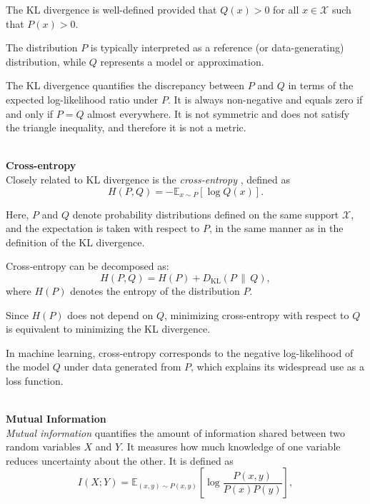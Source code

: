 The KL divergence is well-defined provided that $Q(x) > 0$ for all $x \in \mathcal{X}$ such that $P(x) > 0$.

The distribution $P$ is typically interpreted as a reference (or data-generating) distribution, while $Q$ represents a model or approximation.

The KL divergence quantifies the discrepancy between $P$ and $Q$ in terms of the expected log-likelihood ratio under $P$. It is always non-negative and equals zero if and only if $P = Q$ almost everywhere. It is not symmetric and does not satisfy the triangle inequality, and therefore it is not a metric.

\textbf{\\Cross-entropy\\}
Closely related to KL divergence is the \emph{cross-entropy} \cite{cover2006}, defined as
\begin{equation*}
H(P, Q) = - \mathbb{E}_{x \sim P} [\log Q(x)].
\end{equation*}

Here, $P$ and $Q$ denote probability distributions defined on the same \break support  $\mathcal{X}$, and the expectation is taken with respect to $P$, in the same manner as in the definition of the KL divergence.

Cross-entropy can be decomposed as:
\begin{equation}
H(P, Q) = H(P) + D_{\mathrm{KL}}(P \,\|\, Q),
\end{equation}
where $H(P)$ denotes the entropy of the distribution $P$.

Since $H(P)$ does not depend on $Q$, minimizing cross-entropy with respect to $Q$ is equivalent to minimizing the KL divergence.

In machine learning, cross-entropy corresponds to the negative log-likelihood of the model $Q$ under data generated from $P$, which explains its widespread use \break as a loss function.

\textbf{\\Mutual Information\\}
\emph{Mutual information}\cite{shannon1948,cover2006} quantifies the amount of information shared between two random variables $X$ and $Y$. It measures how much knowledge of one variable reduces uncertainty about the other. It is defined as
\begin{equation}
I(X; Y) = \mathbb{E}_{(x,y) \sim P(x,y)} \left[ \log \frac{P(x,y)}{P(x)P(y)} \right],
\end{equation}

